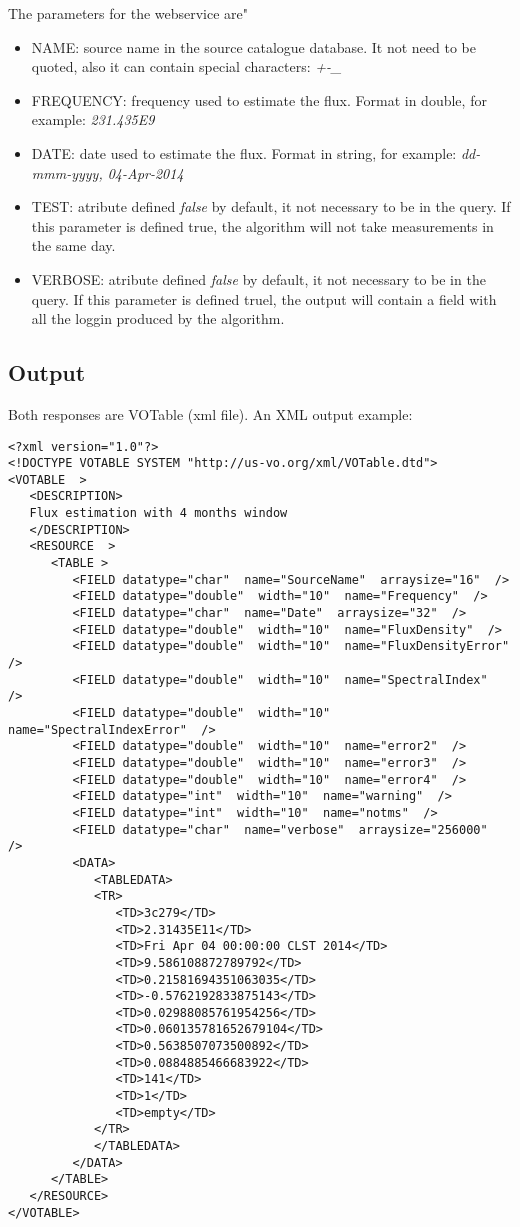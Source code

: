 \documentclass[10pt]{article}
\begin{document}
\noindent The parameters for the webservice are"
\begin{itemize}
 \item NAME: source name in the source catalogue database. It not need to be quoted, also it can contain special characters: \emph{+-\_}
 \item FREQUENCY: frequency used to estimate the flux. Format in double, for example: \emph{231.435E9}
 \item DATE: date used to estimate the flux. Format in string, for example: \emph{dd-mmm-yyyy, 04-Apr-2014}
 \item TEST: atribute defined \emph{false} by default, it not necessary to be in the query. If this parameter is defined true, the algorithm will not take measurements in the same day.
 \item VERBOSE: atribute defined \emph{false} by default, it not necessary to be in the query. If this parameter is defined truel, the output will contain a field with all the loggin produced by the algorithm.
\end{itemize}


\subsection{Output}
\noindent Both responses are VOTable (xml file). An XML output example:
\lstset{language=XML}
\begin{lstlisting}
<?xml version="1.0"?>
<!DOCTYPE VOTABLE SYSTEM "http://us-vo.org/xml/VOTable.dtd">
<VOTABLE  >
   <DESCRIPTION>
   Flux estimation with 4 months window
   </DESCRIPTION>
   <RESOURCE  >
      <TABLE >
         <FIELD datatype="char"  name="SourceName"  arraysize="16"  />
         <FIELD datatype="double"  width="10"  name="Frequency"  />
         <FIELD datatype="char"  name="Date"  arraysize="32"  />
         <FIELD datatype="double"  width="10"  name="FluxDensity"  />
         <FIELD datatype="double"  width="10"  name="FluxDensityError"  />
         <FIELD datatype="double"  width="10"  name="SpectralIndex"  />
         <FIELD datatype="double"  width="10"  name="SpectralIndexError"  />
         <FIELD datatype="double"  width="10"  name="error2"  />
         <FIELD datatype="double"  width="10"  name="error3"  />
         <FIELD datatype="double"  width="10"  name="error4"  />
         <FIELD datatype="int"  width="10"  name="warning"  />
         <FIELD datatype="int"  width="10"  name="notms"  />
         <FIELD datatype="char"  name="verbose"  arraysize="256000"  />
         <DATA>
            <TABLEDATA>
            <TR>
               <TD>3c279</TD>
               <TD>2.31435E11</TD>
               <TD>Fri Apr 04 00:00:00 CLST 2014</TD>
               <TD>9.586108872789792</TD>
               <TD>0.21581694351063035</TD>
               <TD>-0.5762192833875143</TD>
               <TD>0.02988085761954256</TD>
               <TD>0.060135781652679104</TD>
               <TD>0.5638507073500892</TD>
               <TD>0.0884885466683922</TD>
               <TD>141</TD>
               <TD>1</TD>
               <TD>empty</TD>
            </TR>
            </TABLEDATA>
         </DATA>
      </TABLE>
   </RESOURCE>
</VOTABLE>
\end{lstlisting}
\end{document}
